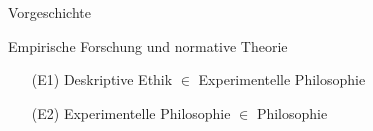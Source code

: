 \documentclass[xcolor=table,9pt,aspectratio=169]{beamer}
\begin{document}
\begin{frame}{\vspace*{10mm}Vorgeschichte}
\end{frame}


\begin{frame}{\vspace*{10mm}Empirische Forschung und normative Theorie}
\begin{itemize}
   \item[(E1)] Deskriptive Ethik $\in$ Experimentelle Philosophie
   \item[(E2)] Experimentelle Philosophie $\in$ Philosophie
\end{itemize}
\end{frame}
\end{document}
